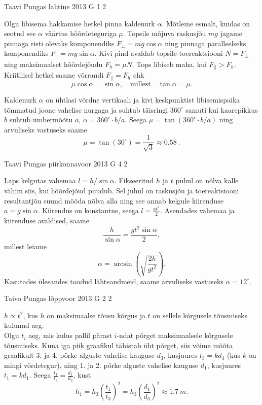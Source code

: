 \documentclass[11pt]{article}
\begin{document}
{%
{Taavi Pungas} %
{lahtine} %
{2013} %
{G 1} %
{2} %
{

\ifSolution
Olgu libisema hakkamise hetkel pinna kaldenurk $\alpha$. Mõtleme esmalt, kuidas on seotud see $\alpha$ väärtus hõõrdeteguriga $\mu$. Topsile mõjuva raskusjõu $mg$ jagame pinnaga risti olevaks komponendiks $F_{\bot}=mg\cos\alpha$ ning pinnaga paralleelseks komponendiks $F_{||}=mg\sin\alpha$. Kivi pind avaldab topsile toereaktsiooni $N=F_\bot$ ning maksimaalset hõõrdejõudu $F_h=\mu N$. Tops libiseb maha, kui $F_{||}>F_h$. Kriitilisel hetkel saame võrrandi $F_{||}=F_h$ ehk
\[ \mu \cos \alpha = \sin\alpha, \quad \text{millest} \quad \tan\alpha = \mu.\]

Kaldenurk $\alpha$ on ühtlasi võrdne vertikaali ja kivi keskpunktist libisemispaika tõmmatud joone vahelise nurgaga ja suhtub täisringi $360^\circ$ samuti kui kaarepikkus $b$ suhtub ümbermõõtu $a$, $\alpha = 360^\circ \!\cdot\! b/a$. Seega $\mu = \tan (360^\circ \! \cdot\! b/a)$ ning arvuliseks vastuseks saame 
\[\mu = \tan (30^\circ) = \frac{1}{\sqrt{3}} \approx \SI{0,58}{}.\]
\fi
}

{Taavi Pungas} %
{piirkonnavoor} %
{2013} %
{G 4} %
{2} %
{

\ifSolution
Laps kelgutas vahemaa $l=h / \sin \alpha$. Fikseeritud $h$ ja $t$ puhul on nõlva kalle vähim siis, kui hõõrdejõud puudub. Sel juhul on raskusjõu ja toereaktsiooni resultantjõu suund mööda nõlva alla ning see annab kelgule kiirenduse $a=g \sin \alpha$. Kiirendus on konstantne, seega $l=\frac{a t^2}{2}$. Asendades vahemaa ja kiirenduse avaldised, saame
\[
\frac{h}{\sin\alpha} = \frac{g t^2 \sin \alpha}{2},
\]
millest leiame
\[
\alpha = \arcsin\left( \sqrt{\frac{2h}{g t^2}}\right).
\]
Kasutades ülesandes toodud lähteandmeid, saame arvuliseks vastuseks $\alpha = 12^\circ$. 
\fi
}

{Taivo Pungas} %
{lõppvoor} %
{2013} %
{G 2} %
{2} %
{

\ifSolution
$h \propto t^{2}$, kus $h$ on maksimaalse tõusu kõrgus ja $t$ on sellele kõrgusele tõusmiseks kulunud aeg.\\
Olgu $t_{i}$ aeg, mis kulus pallil pärast $i$-ndat põrget maksimaalsele kõrgusele tõusmiseks. Kuna iga piik graafikul tähistab üht põrget, siis võime mõõta graafikult 3. ja 4. põrke alguste vahelise kauguse $d_{3}$, kusjuures $t_{3}=kd_{3}$ (kus $k$ on mingi võrdetegur), ning 1. ja 2. põrke alguste vahelise kauguse $d_{1}$, kusjuures $t_{1}=kd_{1}$. Seega 
$\frac{t_{1}}{t_{3}}=\frac{d_{1}}{d_{3}}$, kust
$$h_{1}=h_{3}\left(\frac{t_{1}}{t_{3}}\right)^{2}=h_{3}\left(\frac{d_{1}}{d_{3}}\right)^{2} \approx \SI{1,7}{m}.$$\\
\fi
}

}
\end{document}

